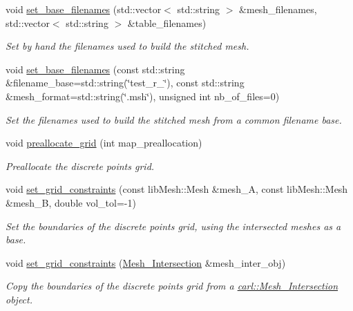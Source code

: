 \begin{DoxyCompactItemize}
void \hyperlink{classcarl_1_1_stitch___meshes_ab088b4d4efb85dd633946d568e7142c4}{set\+\_\+base\+\_\+filenames} (std\+::vector$<$ std\+::string $>$ \&mesh\+\_\+filenames, std\+::vector$<$ std\+::string $>$ \&table\+\_\+filenames)
\begin{DoxyCompactList}\small\item\em Set by hand the filenames used to build the stitched mesh. \end{DoxyCompactList}\item 
void \hyperlink{classcarl_1_1_stitch___meshes_a79fca89fe4b7655f8ee72d1cae07f9a6}{set\+\_\+base\+\_\+filenames} (const std\+::string \&filename\+\_\+base=std\+::string(\char`\"{}test\+\_\+r\+\_\+\char`\"{}), const std\+::string \&mesh\+\_\+format=std\+::string(\char`\"{}.msh\char`\"{}), unsigned int nb\+\_\+of\+\_\+files=0)
\begin{DoxyCompactList}\small\item\em Set the filenames used to build the stitched mesh from a common filename base. \end{DoxyCompactList}\item 
void \hyperlink{classcarl_1_1_stitch___meshes_a4c75b75cd9c0e5d80e6f250df01dc246}{preallocate\+\_\+grid} (int map\+\_\+preallocation)
\begin{DoxyCompactList}\small\item\em Preallocate the discrete points grid. \end{DoxyCompactList}\item 
void \hyperlink{classcarl_1_1_stitch___meshes_ad8e4968e6a190816402c983e88d6be62}{set\+\_\+grid\+\_\+constraints} (const lib\+Mesh\+::\+Mesh \&mesh\+\_\+\+A, const lib\+Mesh\+::\+Mesh \&mesh\+\_\+\+B, double vol\+\_\+tol=-\/1)
\begin{DoxyCompactList}\small\item\em Set the boundaries of the discrete points grid, using the intersected meshes as a base. \end{DoxyCompactList}\item 
void \hyperlink{classcarl_1_1_stitch___meshes_a47164aa70369b6dbb3c81ffd272df4b5}{set\+\_\+grid\+\_\+constraints} (\hyperlink{classcarl_1_1_mesh___intersection}{Mesh\+\_\+\+Intersection} \&mesh\+\_\+inter\+\_\+obj)
\begin{DoxyCompactList}\small\item\em Copy the boundaries of the discrete points grid from a \hyperlink{classcarl_1_1_mesh___intersection}{carl\+::\+Mesh\+\_\+\+Intersection} object. \end{DoxyCompactList}\item 

\end{DoxyCompactItemize}
